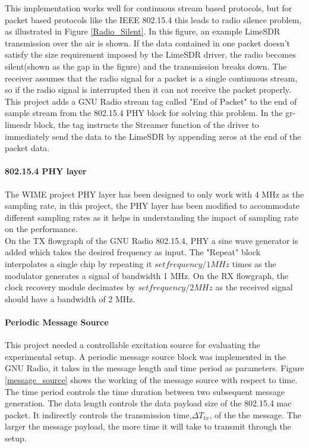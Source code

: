 This implementation works well for continuous stream based protocols, but for packet based protocols like the IEEE 802.15.4 this leads to radio silence problem, as illustrated in Figure \ref{Radio_Silent}.
In this figure, an example LimeSDR transmission over the air is shown.
If the data contained in one packet doesn't satisfy the size requirement imposed by the LimeSDR driver, the radio becomes silent(shown as the gap in the figure) and the transmission breaks down.
The receiver assumes that the radio signal for a packet is a single continuous stream, so if the radio signal is interrupted then it can not receive the packet properly.\\

This project adds a GNU Radio stream tag called "End of Packet" to the end of sample stream from the 802.15.4 PHY block for solving this problem.
In the gr-limesdr block, the tag instructs the Streamer function of the driver to immediately send the data to the LimeSDR by appending zeros at the end of the packet data.

\paragraph{802.15.4 \ac{PHY} layer}

The WIME project \ac{PHY} layer has been designed to only work with 4 MHz as the sampling rate, in this project, the \ac{PHY} layer has been modified to accommodate different sampling rates as it helps in understanding the impact of sampling rate on the performance.\\

On the TX flowgraph of the GNU Radio 802.15.4, \ac{PHY} a sine wave generator is added which takes the desired frequency as input.
The "Repeat" block interpolates a single chip by repeating it $set frequency/1 MHz$ times as the modulator generates a signal of bandwidth 1 MHz.
On the RX flowgraph, the clock recovery module decimates by $set frequency/2 MHz$ as the received signal should have a bandwidth of 2 MHz.

\paragraph{Periodic Message Source} \label{Periodic Message Source}
This project needed a controllable excitation source for evaluating the experimental setup.
A periodic message source block was implemented in the GNU Radio, it takes in the message length and time period as parameters.
Figure \ref{message_source} shows the working of the message source with respect to time.
The time period controls the time duration between two subsequent message generation.
The data length controls the data payload size of the 802.15.4 \ac{mac} packet.
It indirectly controls the transmission time,$\Delta T_{tx}$, of the the message.
The larger the message payload, the more time it will take to transmit through the setup. 
\\

